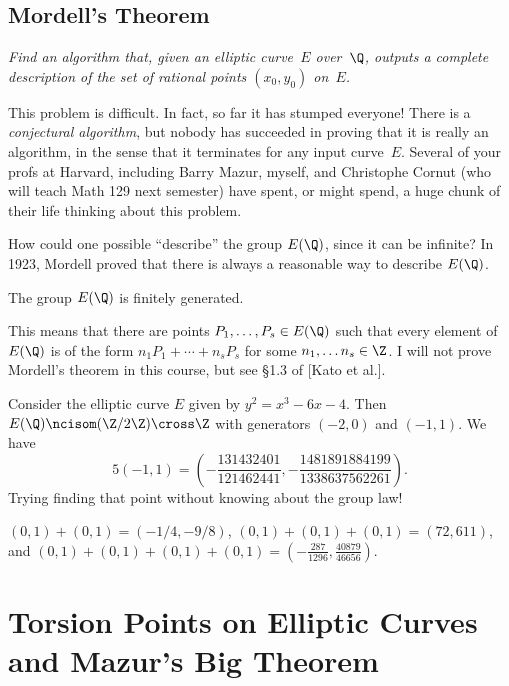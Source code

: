 \documentclass[11pt]{report}
\begin{document}
\section{Mordell's Theorem}
 {\em Find an algorithm that, given
  an elliptic curve~$E$ over~$\Q$, outputs a complete description
  of the set of rational points $(x_0, y_0)$ on~$E$.}\vspace{2ex}

This problem is difficult.  In fact, so far it has stumped everyone!
There is a {\em conjectural algorithm}, but nobody has succeeded in proving
that it is really an algorithm, in the sense that it terminates for
any input curve~$E$.  Several of your profs at Harvard, including
Barry Mazur, myself, and Christophe Cornut (who will teach Math 129
next semester) have spent, or might spend, a huge chunk of
their life thinking about this problem.

How could one possible ``describe'' the group $E(\Q)$, since it can be
infinite?  In 1923, Mordell proved that there is
always a reasonable way to describe $E(\Q)$.

\begin{theorem}[Mordell]
  The group $E(\Q)$ is finitely generated.
\end{theorem}
This means that there are points $P_1,\ldots, P_s \in E(\Q)$
such that every element of $E(\Q)$ is of the form
$
  n_1 P_1 + \cdots + n_s P_s
$
for some $n_1, \ldots n_s\in\Z$.  I will not prove Mordell's theorem in
this course, but see \S1.3 of [Kato et al.].


\begin{example}
  Consider the elliptic curve $E$ given by $y^2 = x^3 -6x - 4$.
  Then $E(\Q)\ncisom (\Z/2\Z)\cross \Z$ with generators $(-2,0)$ and
  $(-1,1)$.  We have
  $$5(-1,1) = \left(-\frac{131432401}{121462441} , -\frac{1481891884199}{1338637562261}\right).$$
  Trying finding that point without knowing about the group law!
\end{example}




$(0,1)+(0,1)=(-1/4, -9/8)$,
$(0,1)+(0,1)+(0,1)=(72,611)$,
and $(0,1)+(0,1)+(0,1)+(0,1)=\left(-\frac{287}{1296}, \frac{40879}{46656}\right)$.


\chapter{Torsion Points on Elliptic Curves and Mazur's Big Theorem}
\end{document}
